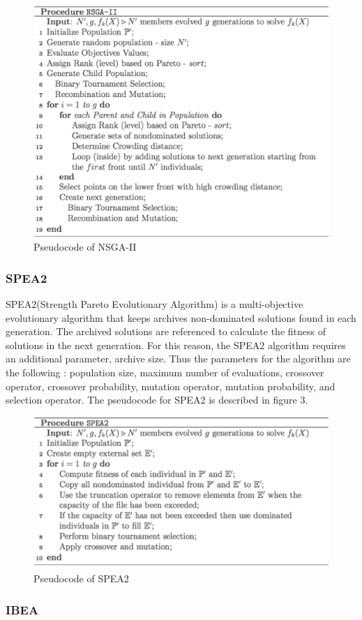 \documentclass[a4paper,12pt]{article}
\begin{document}
\begin{figure}[h!]
\centering
\includegraphics[width=.7\linewidth]{Images/NSGAII.png}
\caption{Pseudocode of NSGA-II}
\label{fig:computerNo}
\end{figure}

\subsubsection{SPEA2} 
SPEA2(Strength Pareto Evolutionary Algorithm) is a multi-objective evolutionary algorithm that keeps archives non-dominated solutions found in each generation. The archived solutions are referenced to calculate the fitness of solutions in the next generation. For this reason, the SPEA2 algorithm requires an additional parameter, archive size. Thus the parameters for the algorithm are the following : population size, maximum number of evaluations, crossover operator, crossover probability, mutation operator, mutation probability, and selection operator.
The pseudocode for SPEA2 is described in figure 3. 

\begin{figure}[h!]
\centering
\includegraphics[width=.7\linewidth]{Images/SPEA2.png}
\caption{Pseudocode of SPEA2}
\label{fig:computerNo}
\end{figure}

\subsubsection{IBEA}
\end{document}
